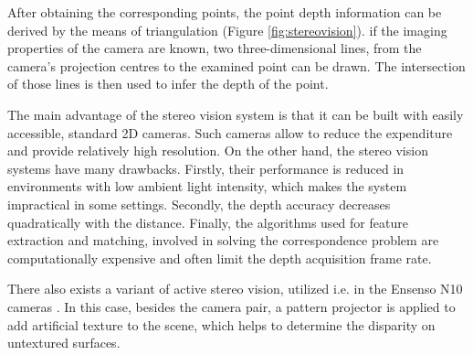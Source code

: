 After obtaining the corresponding points, the point depth information can be derived by the means of triangulation (Figure \ref{fig:stereovision}). if the imaging properties of the camera are known, two three-dimensional lines, from the camera's projection centres to the examined point can be drawn. The intersection of those lines is then used to infer the depth of the point. 

The main advantage of the stereo vision system is that it can be built with easily accessible, standard 2D cameras. Such cameras allow to reduce the expenditure and provide relatively high resolution. On the other hand, the stereo vision systems have many drawbacks. Firstly, their performance is reduced in environments with low ambient light intensity, which makes the system impractical in some settings. Secondly, the depth accuracy decreases quadratically with the distance. Finally, the algorithms used for feature extraction and matching, involved in solving the correspondence problem are computationally expensive and often limit the depth acquisition frame rate.


 There also exists a variant of active stereo vision, utilized i.e. in the Ensenso N10 cameras \cite{ensenso}. In this case, besides the camera pair, a pattern projector is applied to add artificial texture to the scene, which helps to determine the disparity on untextured surfaces.



